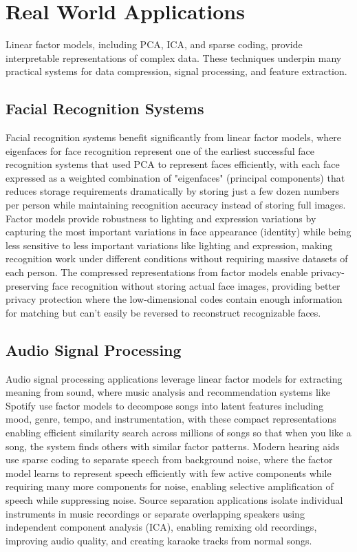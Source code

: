 
\section{Real World Applications}
\label{sec:linear-factor-real-world}


Linear factor models, including PCA, ICA, and sparse coding, provide interpretable representations of complex data. These techniques underpin many practical systems for data compression, signal processing, and feature extraction.

\subsection{Facial Recognition Systems}

Facial recognition systems benefit significantly from linear factor models, where eigenfaces for face recognition represent one of the earliest successful face recognition systems that used PCA to represent faces efficiently, with each face expressed as a weighted combination of "eigenfaces" (principal components) that reduces storage requirements dramatically by storing just a few dozen numbers per person while maintaining recognition accuracy instead of storing full images. Factor models provide robustness to lighting and expression variations by capturing the most important variations in face appearance (identity) while being less sensitive to less important variations like lighting and expression, making recognition work under different conditions without requiring massive datasets of each person. The compressed representations from factor models enable privacy-preserving face recognition without storing actual face images, providing better privacy protection where the low-dimensional codes contain enough information for matching but can't easily be reversed to reconstruct recognizable faces.

\subsection{Audio Signal Processing}

Audio signal processing applications leverage linear factor models for extracting meaning from sound, where music analysis and recommendation systems like Spotify use factor models to decompose songs into latent features including mood, genre, tempo, and instrumentation, with these compact representations enabling efficient similarity search across millions of songs so that when you like a song, the system finds others with similar factor patterns. Modern hearing aids use sparse coding to separate speech from background noise, where the factor model learns to represent speech efficiently with few active components while requiring many more components for noise, enabling selective amplification of speech while suppressing noise. Source separation applications isolate individual instruments in music recordings or separate overlapping speakers using independent component analysis (ICA), enabling remixing old recordings, improving audio quality, and creating karaoke tracks from normal songs.


